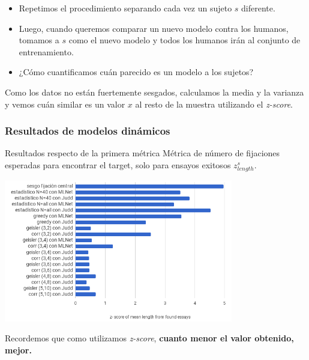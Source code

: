 \documentclass[compress]{beamer}
\begin{document}
\begin{frame}
\begin{itemize}
\item Repetimos el procedimiento separando cada vez un sujeto $s$ diferente.
\item Luego, cuando queremos comparar un nuevo modelo contra los humanos, tomamos a $s$ como el nuevo modelo y todos los humanos irán al conjunto de entrenamiento.
\item ¿Cómo cuantificamos cuán parecido es un modelo a los sujetos?
\end{itemize}

\bigskip
\pause

Como los datos no están fuertemente sesgados, calculamos la media y la varianza y vemos cuán similar es un valor $x$ al resto de la muestra utilizando el \textit{z-score}.

\end{frame}

\subsubsection{Resultados de modelos dinámicos}
\begin{frame}{Resultados respecto de la primera métrica}
{Métrica de número de fijaciones esperadas para
encontrar el target, solo para ensayos exitosos $z_{length}^s$.}

\begin{center}
\includegraphics[width=0.75\textwidth]{images/z-score-mean-length.png}
\end{center}
{\scriptsize Recordemos que como utilizamos \textit{z-score}, \textbf{cuanto menor el valor obtenido, mejor.}}
\end{frame}
\end{document}
